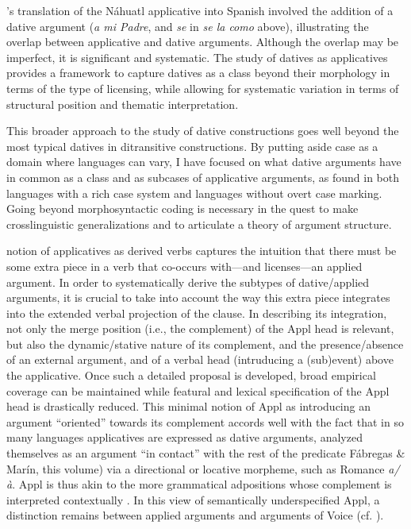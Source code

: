 \documentclass[output=paper,colorlinks,citecolor=brown,nonflat]{./langscibook}
\begin{document}
\citeauthor{Carochi1645}’s translation of the Náhuatl applicative into Spanish involved the addition of a dative argument (\textit{a mi Padre}, and \textit{se} in \textit{se la como} above),  illustrating the overlap between applicative and dative arguments. Although the overlap may be imperfect, it is significant and systematic. The study of datives as applicatives provides a framework to capture datives as a class beyond their morphology in terms of the type of licensing, while allowing for systematic variation in terms of structural position and thematic interpretation. 

This broader approach to the study of dative constructions goes well beyond the most typical datives in ditransitive constructions. By putting aside case as a domain where languages can vary, I have focused on what dative arguments have in common as a class and as subcases of applicative arguments, as found in both languages with a rich case system and languages without overt case marking. Going beyond morphosyntactic coding is necessary in the quest to make crosslinguistic generalizations and to articulate a theory of argument structure.

 notion of applicatives as derived verbs captures the intuition that there must be some extra piece in a verb that co-occurs with—and licenses—an applied argument. In order to systematically derive the subtypes of dative/applied arguments, it is crucial to take into account the way this extra piece integrates into the extended verbal projection of the clause. In describing its integration, not only the merge position (i.e., the complement) of the Appl head is relevant, but also the dynamic/stative nature of its complement, and the presence/absence of an external argument, and of a verbal head (intruducing a (sub)event) above the applicative. Once such a detailed proposal is developed, broad empirical coverage can be maintained while featural and lexical specification of the Appl head is drastically reduced. This minimal notion of Appl as introducing an argument “oriented” towards its complement accords well with the fact that in so many languages applicatives are expressed as dative arguments, analyzed themselves as an argument “in contact” with the rest of the predicate Fábregas \& Marín, this volume) via a directional or locative morpheme, such as Romance \textit{a/à}. Appl is thus akin to the more grammatical adpositions whose complement is interpreted contextually \citep{Svenonius2007}. In this view of semantically underspecified Appl, a distinction remains between applied arguments and arguments of Voice (cf. \citealt{WoodMarantz2017}). 
\end{document}
